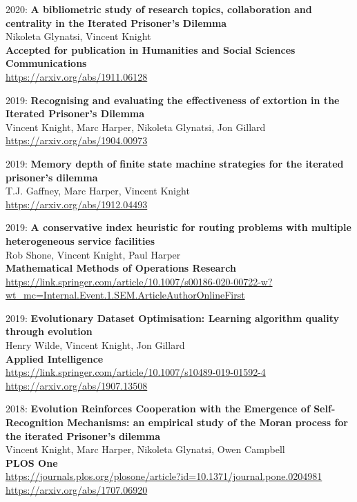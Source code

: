 \documentclass[10pt]{res} %
\begin{document}
\begin{resume}
\begin{etaremune}
\item
2020: \textbf{A bibliometric study of research topics, collaboration and centrality in the Iterated Prisoner's Dilemma}\\
Nikoleta Glynatsi, Vincent Knight
\\
\textbf{Accepted for publication in Humanities and Social Sciences Communications}
\\
\url{https://arxiv.org/abs/1911.06128}
\\

\item
2019: \textbf{Recognising and evaluating the effectiveness of extortion in the Iterated Prisoner's Dilemma}\\
Vincent Knight, Marc Harper, Nikoleta Glynatsi, Jon Gillard
\\
\url{https://arxiv.org/abs/1904.00973}
\\

\item
2019: \textbf{Memory depth of finite state machine strategies for the iterated prisoner's dilemma}\\
T.J. Gaffney, Marc Harper, Vincent Knight
\\
\url{https://arxiv.org/abs/1912.04493}
\\

\item
2019: \textbf{A conservative index heuristic for routing problems with multiple heterogeneous service facilities}\\
Rob Shone, Vincent Knight, Paul Harper
\\
\textbf{Mathematical Methods of Operations Research}
\\
\url{https://link.springer.com/article/10.1007/s00186-020-00722-w?wt_mc=Internal.Event.1.SEM.ArticleAuthorOnlineFirst}
\\

\item
2019: \textbf{Evolutionary Dataset Optimisation: Learning algorithm quality through evolution}\\
Henry Wilde, Vincent Knight, Jon Gillard
\\
\textbf{Applied Intelligence}
\\
\url{https://link.springer.com/article/10.1007/s10489-019-01592-4}
\\
\url{https://arxiv.org/abs/1907.13508}
\\

\item
2018: \textbf{Evolution Reinforces Cooperation with the Emergence of Self-Recognition Mechanisms: an empirical study of the Moran process for the iterated Prisoner's dilemma }\\
Vincent Knight, Marc Harper, Nikoleta Glynatsi, Owen Campbell
\\
\textbf{PLOS One}
\\
\url{https://journals.plos.org/plosone/article?id=10.1371/journal.pone.0204981}
\\
\url{https://arxiv.org/abs/1707.06920}
\\


\end{etaremune}
\end{resume}
\end{document}
